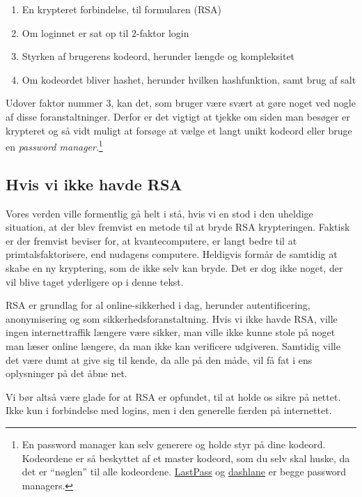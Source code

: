 \begin{enumerate}[noitemsep]
    \item En krypteret forbindelse, til formularen (RSA)
    \item Om loginnet er sat op til 2-faktor login
    \item Styrken af brugerens kodeord, herunder længde og kompleksitet
    \item Om kodeordet bliver hashet, herunder hvilken hashfunktion, samt brug af salt
\end{enumerate}


Udover faktor nummer 3, kan det, som bruger være svært at gøre noget ved nogle af disse foranstaltninger.
Derfor er det vigtigt at tjekke om siden man besøger er krypteret og så vidt muligt at forsøge at vælge et langt unikt kodeord eller bruge en \emph{password manager}.\footnote{En password manager kan selv generere og holde styr på dine kodeord. Kodeordene er så beskyttet af et master kodeord, som du selv skal huske, da det er ``nøglen'' til alle kodeordene. \href{https://www.lastpass.com/}{LastPass} og \href{https://www.dashlane.com/}{dashlane} er begge password managers.}

\subsection{Hvis vi ikke havde RSA}
Vores verden ville formentlig gå helt i stå, hvis vi en stod i den uheldige situation, at der blev fremvist en metode til at bryde RSA krypteringen.
Faktisk er der fremvist beviser for, at kvantecomputere, er langt bedre til at primtalsfaktorisere, end nudagens computere.\cite{quantum}
Heldigvis formår de samtidig at skabe en ny kryptering, som de ikke selv kan bryde.
Det er dog ikke noget, der vil blive taget yderligere op i denne tekst.

RSA er grundlag for al online-sikkerhed i dag, herunder autentificering, anonymisering og som sikkerhedsforanstaltning.
Hvis vi ikke havde RSA, ville ingen internettraffik længere være sikker, man ville ikke kunne stole på noget man læser online længere, da man ikke kan verificere udgiveren.
Samtidig ville det være dumt at give sig til kende, da alle på den måde, vil få fat i ens oplysninger på det åbne net.

Vi bør altså være glade for at RSA er opfundet, til at holde os sikre på nettet. Ikke kun i forbindelse med logins, men i den generelle færden på internettet.
